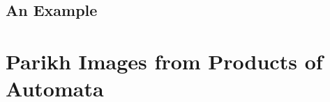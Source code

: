 \documentclass{easychair}
\theoremstyle{definition}
\newtheorem{definition}{Definition}[section]
\newif\ifoutline
\newcommand{\contents}[1]{\ifoutline{\color{blue}
    \begin{itemize}
    #1
    \end{itemize}
  }\fi}
\begin{document}
\subsection{An Example}

\section{Parikh Images from Products of Automata}
  
\contents{
    \item additional rules needed for products
    \item backjumping and conflict-driven learning
    }


\end{document}
